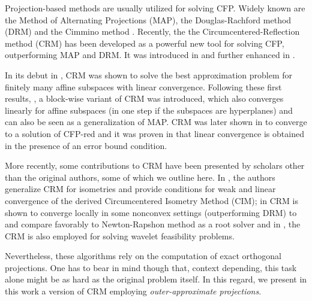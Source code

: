 \documentclass[smallextended,numbook,nospthms]{svjour3}
\theoremstyle{plain}
\theoremstyle{definition}
\def\RR{\mathds R}
\begin{document}

Projection-based methods are usually utilized for solving CFP. Widely known are the Method of Alternating Projections (MAP), the Douglas-Rachford method (DRM) and the Cimmino method \cite{Cimmino:1938tp}. Recently, the the Circumcentered-Reflection method (CRM) has been developed as a powerful new tool for solving CFP, outperforming MAP and DRM. It was introduced in \cite{Behling:2018a,Behling:2018} and further enhanced in \cite{Arefidamghani:2020,Bauschke:2018ut,Bauschke:2018wa, Bauschke:2019uh,Bauschke:2020a,Behling:2019dj,Behling:2020,Dizon:2019vq,Dizon:2020a,Ouyang:2018gu,Lindstrom:2020a}. 

In its debut in \cite{Behling:2018a,Behling:2018}, CRM was shown to solve the best approximation problem for finitely many affine subspaces with linear convergence. Following these first results, \cite{Behling:2019dj}, a block-wise variant of CRM was introduced, which also converges linearly for affine subspaces (in one step if the subspaces are hyperplanes) and can also be seen as a generalization of MAP. CRM was later shown in \cite{Behling:2020} to converge to a solution of CFP-red and it was proven in \cite{Arefidamghani:2020} that linear convergence is obtained in the presence of an error bound condition.

More recently, some contributions to CRM have been presented by scholars other than the original authors, some of which we outline here. In \cite{Bauschke:2019uh,Bauschke:2020a}, the authors generalize CRM for isometries and provide conditions for weak and linear convergence of the derived Circumcentered Isometry Method (CIM); in \cite{Dizon:2019vq} CRM is shown to converge locally in some nonconvex settings (outperforming DRM) to and compare favorably to Newton-Rapshon method as a root solver and in \cite{Dizon:2020a}, the CRM is also employed for solving wavelet feasibility problems.

Nevertheless, these algorithms rely on the computation of exact orthogonal projections. One has to bear in mind though that, context depending, this task alone might be as hard as the original problem itself. In this regard, we present in this work a version of CRM employing \emph{outer-approximate projections}. 
\end{document}
